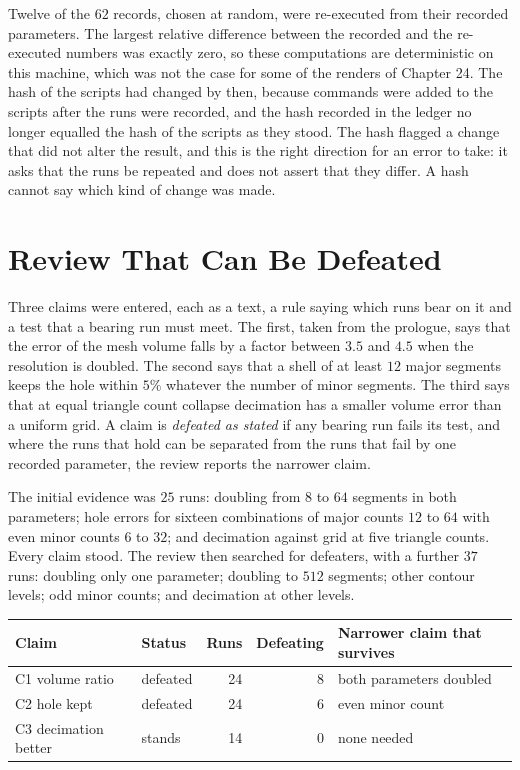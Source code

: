 Twelve of the $62$ records, chosen at random, were re-executed from their recorded parameters. The largest relative difference between the recorded and the re-executed numbers was exactly zero, so these computations are deterministic on this machine, which was not the case for some of the renders of Chapter 24. The hash of the scripts had changed by then, because commands were added to the scripts after the runs were recorded, and the hash recorded in the ledger no longer equalled the hash of the scripts as they stood. The hash flagged a change that did not alter the result, and this is the right direction for an error to take: it asks that the runs be repeated and does not assert that they differ. A hash cannot say which kind of change was made.

\section{Review That Can Be Defeated}

Three claims were entered, each as a text, a rule saying which runs bear on it and a test that a bearing run must meet. The first, taken from the prologue, says that the error of the mesh volume falls by a factor between $3.5$ and $4.5$ when the resolution is doubled. The second says that a shell of at least $12$ major segments keeps the hole within $5\%$ whatever the number of minor segments. The third says that at equal triangle count collapse decimation has a smaller volume error than a uniform grid. A claim is \emph{defeated as stated} if any bearing run fails its test, and where the runs that hold can be separated from the runs that fail by one recorded parameter, the review reports the narrower claim.

The initial evidence was $25$ runs: doubling from $8$ to $64$ segments in both parameters; hole errors for sixteen combinations of major counts $12$ to $64$ with even minor counts $6$ to $32$; and decimation against grid at five triangle counts. Every claim stood. The review then searched for defeaters, with a further $37$ runs: doubling only one parameter; doubling to $512$ segments; other contour levels; odd minor counts; and decimation at other levels.

\begin{center}
\small
\begin{tabular}{llrrl}
\toprule
Claim & Status & Runs & Defeating & Narrower claim that survives\\
\midrule
C1 volume ratio & defeated & 24 & 8 & both parameters doubled\\
C2 hole kept & defeated & 24 & 6 & even minor count\\
C3 decimation better & stands & 14 & 0 & none needed\\
\bottomrule
\end{tabular}
\end{center}

